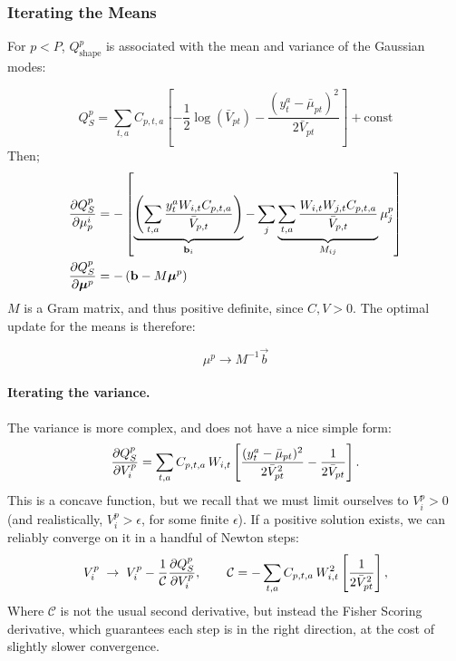 	\subsubsection{Iterating the Means} For $p < P$, $Q_\text{shape}^p$ is associated with the mean and variance of the Gaussian modes:

		\begin{equation}
			Q_S^p = \sum_{t,a} C_{p,t,a} \left[ -\frac{1}{2} \log(\bar{V}_{pt}) - \frac{(y_t^a - \bar{\mu}_{pt})^2}{2 \bar{V}_{pt}} \right] + \text{const}
		\end{equation}
		Then;
		\begin{equation}
			\begin{split}
				\frac{\partial{} Q_S^p}{\partial{} \mu_p^i}     & = - \left[ \underbrace{\left( \sum_{t,a} \frac{y_t^a W_{i,t} C_{p,t,a}}{\bar{V}_{p,t}} \right)}_{\mathbf{\boldsymbol{\mathrm{b}}}_i} - \sum_j \underbrace{\sum_{t,a} \frac{W_{i,t} W_{j,t} C_{p,t,a}}{\bar{V}_{p,t}}}_{M_{ij}} \mu_j^p \right]
				\\
				\frac{\partial{} Q_S^p}{\partial{} \mathbf{\boldsymbol{\mathrm{\mu}}}^p} & = - \left( \mathbf{\boldsymbol{\mathrm{b}}} - M \mathbf{\boldsymbol{\mathrm{\mu}}}^p \right)
			\end{split}
		\end{equation}
		$M$ is a Gram matrix, and thus positive definite, since $C, V > 0$. The optimal update for the means is therefore:

		\begin{equation}
			\mu^p \to M^{-1} \vec{b}
		\end{equation}

		\paragraph{Iterating the variance.} The variance is more complex, and does not have a nice simple form:
		\begin{equation}
			\frac{\partial{} Q_S^p}{\partial{} V_i^p} = \sum_{t,a} C_{p,t,a}\, W_{i,t}\left[\frac{(y_t^a-\bar\mu_{pt})^2}{2\bar V_{pt}^2} - \frac{1}{2\bar V_{pt}}\right].
		\end{equation}
		This is a concave function, but we recall that we must limit ourselves to $V_i^p > 0$ (and realistically, $V_i^p > \epsilon$, for some finite $\epsilon$). If a positive solution exists, we can reliably converge on it in a handful of Newton steps:
		\begin{equation}
			V_i^p \;\to\; V_i^p - \frac{1}{\mathcal{C}}\frac{\partial{} Q_S^p}{\partial{} V_i^p}, \qquad
			\mathcal{C} = -\sum_{t,a} C_{p,t,a}\,W_{i,t}^2\left[\frac{1}{2 \bar V_{pt}^2} \right],
		\end{equation}
		Where $\mathcal{C}$ is not the usual second derivative, but instead the Fisher Scoring derivative, which guarantees each step is in the right direction, at the cost of slightly slower convergence.
